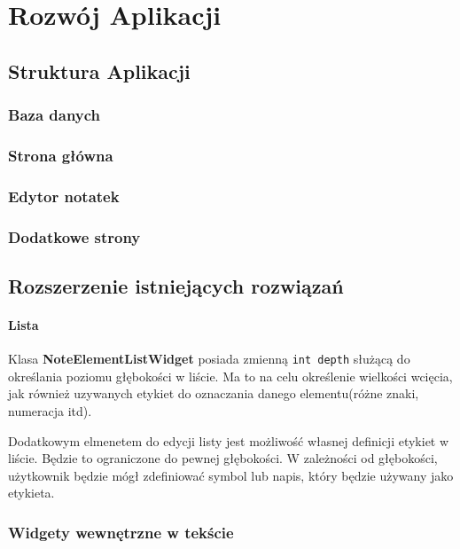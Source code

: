 

\chapter{Rozwój Aplikacji}

\section{Struktura Aplikacji}

\subsection{Baza danych}

\subsection{Strona główna}

\subsection{Edytor notatek}

\subsection{Dodatkowe strony}

\section{Rozszerzenie istniejących rozwiązań}

\subsubsection{Lista}

Klasa \textbf{NoteElementListWidget} posiada zmienną \verb|int depth| służącą do określania poziomu głębokości w liście. Ma to na celu określenie wielkości wcięcia, jak również uzywanych etykiet do oznaczania danego elementu(różne znaki, numeracja itd).

Dodatkowym elmenetem do edycji listy jest możliwość własnej definicji etykiet w liście. Będzie to ograniczone do pewnej głębokości. W zależności od głębokości, użytkownik będzie mógł zdefiniować symbol lub napis, który będzie używany jako etykieta.

\subsection{Widgety wewnętrzne w tekście}

